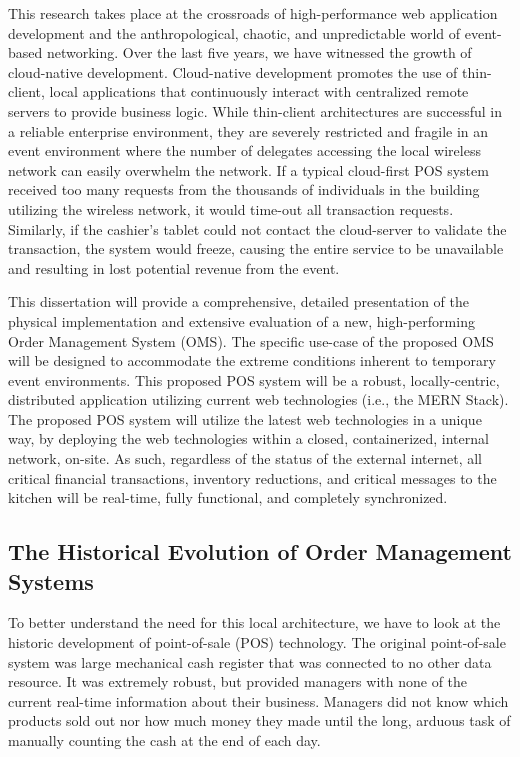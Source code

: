 This research takes place at the crossroads of high-performance web application development and the anthropological, chaotic, and unpredictable world of event-based networking. Over the last five years, we have witnessed the growth of cloud-native development. Cloud-native development promotes the use of thin-client, local applications that continuously interact with centralized remote servers to provide business logic. While thin-client architectures are successful in a reliable enterprise environment, they are severely restricted and fragile in an event environment where the number of delegates accessing the local wireless network can easily overwhelm the network. If a typical cloud-first POS system received too many requests from the thousands of individuals in the building utilizing the wireless network, it would time-out all transaction requests. Similarly, if the cashier's tablet could not contact the cloud-server to validate the transaction, the system would freeze, causing the entire service to be unavailable and resulting in lost potential revenue from the event.

This dissertation will provide a comprehensive, detailed presentation of the physical implementation and extensive evaluation of a new, high-performing Order Management System (OMS). The specific use-case of the proposed OMS will be designed to accommodate the extreme conditions inherent to temporary event environments. This proposed POS system will be a robust, locally-centric, distributed application utilizing current web technologies (i.e., the MERN Stack). The proposed POS system will utilize the latest web technologies in a unique way, by deploying the web technologies within a closed, containerized, internal network, on-site. As such, regardless of the status of the external internet, all critical financial transactions, inventory reductions, and critical messages to the kitchen will be real-time, fully functional, and completely synchronized.

\subsection{The Historical Evolution of Order Management Systems}

To better understand the need for this local architecture, we have to look at the historic development of point-of-sale (POS) technology. The original point-of-sale system was large mechanical cash register that was connected to no other data resource. It was extremely robust, but provided managers with none of the current real-time information about their business. Managers did not know which products sold out nor how much money they made until the long, arduous task of manually counting the cash at the end of each day.


